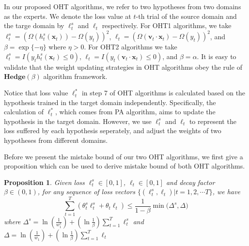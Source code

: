 \documentclass[letterpaper]{article}
\newtheorem{prop}{Proposition}
\theoremstyle{remark}
\theoremstyle{definition}
\begin{document}
In our proposed OHT algorithms, we refer to two hypotheses from two domains as the experts.
We denote the loss value at $t$-th trial of the source domain and the targe domain by $\ell_{t}^{s}$ and $\ell_t$ respectively.
For OHT1 algorithms, we take $\ell_{t}^{s} = (\varOmega(h_{t}^{s}(\mathbf{x}_t)) - \varOmega(y_t)) ^ 2$, $\ell_t = (\varOmega(\mathbf{v}_t \cdot \mathbf{x}_t) - \varOmega(y_t)) ^ 2$, and $\beta = \exp\{-\eta\}$ where $\eta > 0$.
For OHT2 algorithms we take $\ell_{t}^{s} = I(y_t h_{t}^{s}(\mathbf{x}_t) \leq 0)$, $\ell_t = I(y_t (\mathbf{v}_t \cdot \mathbf{x}_t) \leq 0)$, and $\beta = \alpha$.
It is easy to validate that the weight updating strategies in OHT algorithms obey the rule of $\mathbf{Hedge}(\beta)$ algorithm framework.

Notice that loss value $\ell_{t}^{*}$ in step 7 of OHT algorithms is calculated based on the hypothesis trained in the target domain independently.
Specifically, the calculation of $\ell_{t}^{*}$, which comes from PA algorithm, aims to update the hypothesis in the target domain.
However, we use $\ell_{t}^{s}$ and $\ell_t$ to represent the loss suffered by each hypothesis seperately, and adjust the weights of two hypotheses from different domains.

Before we present the mistake bound of our two OHT algorithms, we first give a proposition which can be used to derive mistake bound of both OHT algorithms.

\begin{prop}
Given loss $\ell_{t}^{s} \in [0,1]$, $\ell_t \in [0,1]$ and decay factor $\beta \in (0,1)$, for any sequence of loss vectors $\{ (\ell_{t}^{s}, \ell_{t}) | t = 1, 2, \cdots T \} $, we have
$$ \sum\limits_{t=1}^{T} ( \theta_{t}^{s} \ell_{t}^{s} + \theta_t \ell_t ) \leq \frac{1}{1-\beta} \min \big( \varDelta^s, \varDelta \big) $$
where
$ \varDelta^s = \ln(\frac{1}{w_{1}^{s}}) + (\ln \frac{1}{\beta}) \sum\limits_{t=1}^{T} \ell_{t}^{s} $ and $ \varDelta = \ln(\frac{1}{w_{1}}) + (\ln \frac{1}{\beta}) \sum\limits_{t=1}^{T} \ell_{t} $
\end{prop}
\end{document}
